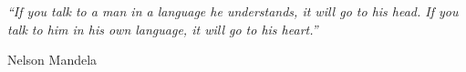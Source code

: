 \pagestyle{empty}  %

\null\vfill
\textit{``If you talk to a man in a language he understands, it will go to his head. If you talk to him in his own language, it will go to his heart.''}

\begin{flushright}
Nelson Mandela
\end{flushright}

\vfill\vfill\vfill\vfill\vfill\vfill\null
\clearpage  %
